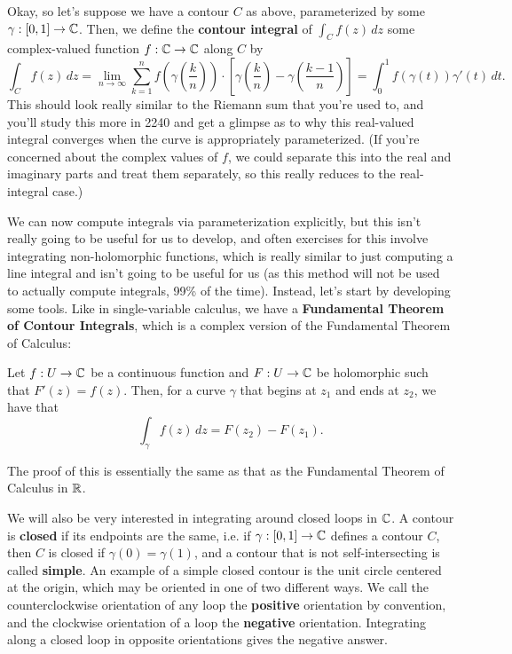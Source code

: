 Okay, so let's suppose we have a contour $C$ as above, parameterized by some $\gamma: [0,1] \to \mathbb C$. Then, we define the \textbf{contour integral} of $\int_C f(z) \, dz$ some complex-valued function $f : \mathbb C \to \mathbb C$ along $C$ by
\[ \int_C f(z) \, dz = \lim_{n\to \infty} \sum_{k=1}^n f \left(\gamma\left(\frac k n \right)\right)  \cdot \left[\gamma \left(\frac k n\right) - \gamma\left(\frac{k-1} n \right) \right] = \int_0^1 f(\gamma(t)) \gamma'(t) \, dt .\]
This should look really similar to the Riemann sum that you're used to, and you'll study this more in 2240 and get a glimpse as to why this real-valued integral converges when the curve is appropriately parameterized. (If you're concerned about the complex values of $f$, we could separate this into the real and imaginary parts and treat them separately, so this really reduces to the real-integral case.)

We can now compute integrals via parameterization explicitly, but this isn't really going to be useful for us to develop, and often exercises for this involve integrating non-holomorphic functions, which is really similar to just computing a line integral and isn't going to be useful for us (as this method will not be used to actually compute integrals, 99\% of the time). Instead, let's start by developing some tools. Like in single-variable calculus, we have a \textbf{Fundamental Theorem of Contour Integrals}, which is a complex version of the Fundamental Theorem of Calculus:
\begin{theorem}
  Let $f : U \to \mathbb C$ be a continuous function and $F : U \to \mathbb C$ be holomorphic such that $F'(z) = f(z)$. Then, for a curve $\gamma$ that begins at $z_1$ and ends at $z_2$, we have that \[\int_\gamma f(z) \, dz = F(z_2) - F(z_1).\]
\end{theorem}
The proof of this is essentially the same as that as the Fundamental Theorem of Calculus in $\mathbb R$.

We will also be very interested in integrating around closed loops in $\mathbb C$. A contour is \textbf{closed} if its endpoints are the same, i.e. if $\gamma : [0,1] \to \mathbb C$ defines a contour $C$, then $C$ is closed if $\gamma(0) = \gamma(1)$, and a contour that is not self-intersecting is called \textbf{simple}. An example of a simple closed contour is the unit circle centered at the origin, which may be oriented in one of two different ways. We call the counterclockwise orientation of any loop the \textbf{positive} orientation by convention, and the clockwise orientation of a loop the \textbf{negative} orientation. Integrating along a closed loop in opposite orientations gives the negative answer.

